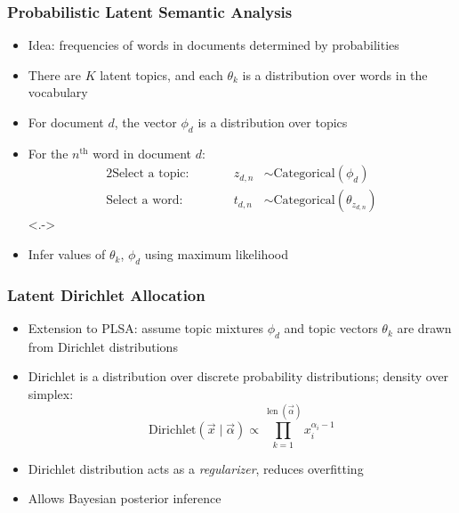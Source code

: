 \documentclass{beamer}
\newcommand{\nth}{^{\text{th}}}
\newcommand{\len}{\mathop{\text{len}}}
\begin{document}
\begin{frame}
\frametitle{Probabilistic Latent Semantic Analysis}
\begin{itemize}[<+->]
\item Idea: frequencies of words in documents determined by probabilities
\item There are $K$ latent topics, and each $\theta_k$ is a distribution over words in the vocabulary
\item For document $d$, the vector $\phi_d$ is a distribution over topics
\item For the $n\nth$ word in document $d$:
\begin{alignat*}{2}
\text{Select a topic:}&\qquad& z_{d,n} &\sim \text{Categorical}(\phi_d) \\
\text{Select a word:}&\qquad& t_{d,n} &\sim \text{Categorical}(\theta_{z_{d,n}})
\end{alignat*}
\onslide<.->
\begin{center}
\end{center}
\end{itemize}

\begin{itemize}[<+->]
\item Infer values of $\theta_k$, $\phi_d$ using maximum likelihood
\end{itemize}
\end{frame}

\begin{frame}
\frametitle{Latent Dirichlet Allocation}
\begin{itemize}[<+->]
\item Extension to PLSA: assume topic mixtures $\phi_d$ and topic vectors $\theta_k$ are drawn from Dirichlet distributions
\item Dirichlet is a distribution over discrete probability distributions; density over simplex:
\[ \text{Dirichlet}(\vec x \mid \vec \alpha) \propto \prod_{k=1}^{\len(\vec\alpha)} x_i^{\alpha_i - 1} \]
\item Dirichlet distribution acts as a \emph{regularizer}, reduces overfitting
\item Allows Bayesian posterior inference
\end{itemize}
\end{frame}
\end{document}
